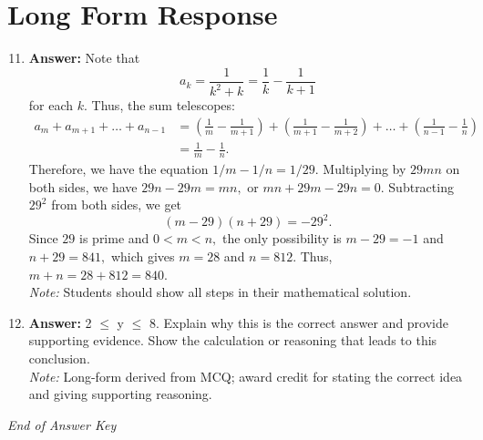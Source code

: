 \documentclass[12pt]{article}
\begin{document}
\section*{Long Form Response}
\begin{enumerate}[label=\arabic*.]
\setcounter{enumi}{10}
\item \textbf{Answer:} Note that \[a_k = \frac{1}{k^2+k} = \frac{1}{k} - \frac{1}{k+1}\]for each $k.$ Thus, the sum telescopes: \[\begin{aligned} a_m + a_{m+1} + \dots + a_{n-1} & = \left(\frac{1}{m} - \frac{1}{m+1}\right) + \left(\frac{1}{m+1} - \frac{1}{m+2}\right) + \dots + \left(\frac{1}{n-1} - \frac{1}{n}\right) \\ &= \frac{1}{m} - \frac{1}{n}. \end{aligned}\]Therefore, we have the equation $1/m - 1/n = 1/29.$ Multiplying by $29 mn$ on both sides, we have $29 n - 29 m = mn,$ or $mn + 29 m - 29 n = 0.$ Subtracting $29^2$ from both sides, we get \[(m-29)(n+29) = -29^2.\]Since $29$ is prime and $0 < m < n,$ the only possibility is $m-29 = -1$ and $n+29 = 841,$ which gives $m = 28$ and $n = 812.$ Thus, $m+n=28+812=\boxed{840}.$
\\ \textit{Note:} Students should show all steps in their mathematical solution.
\item \textbf{Answer:} 2 \ensuremath{\leq} y \ensuremath{\leq} 8. Explain why this is the correct answer and provide supporting evidence. Show the calculation or reasoning that leads to this conclusion.
\\ \textit{Note:} Long-form derived from MCQ; award credit for stating the correct idea and giving supporting reasoning.
\end{enumerate}

\vfill
\noindent\textit{End of Answer Key}
\end{document}
